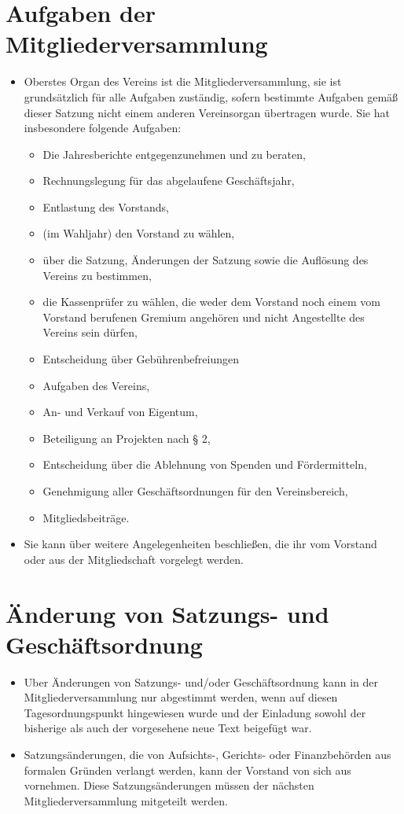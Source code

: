 \documentclass[a4paper,10pt]{article}
\begin{document}
\section{Aufgaben der Mitgliederversammlung}
  \begin{itemize}
   \item Oberstes Organ des Vereins ist die Mitgliederversammlung, sie ist grundsätzlich für alle Aufgaben zuständig, sofern bestimmte Aufgaben gemäß dieser Satzung nicht einem anderen Vereinsorgan übertragen wurde. Sie hat insbesondere folgende Aufgaben: 
   \begin{itemize}
    \item Die Jahresberichte entgegenzunehmen und zu beraten, 
    \item Rechnungslegung für das abgelaufene Geschäftsjahr, 
    \item Entlastung des Vorstands, 
    \item (im Wahljahr) den Vorstand zu wählen, 
    \item über die Satzung, Änderungen der Satzung sowie die Auflösung des Vereins zu bestimmen, 
    \item die Kassenprüfer zu wählen, die weder dem Vorstand noch einem vom Vorstand berufenen Gremium angehören und nicht Angestellte des Vereins sein dürfen, 
    \item Entscheidung über Gebührenbefreiungen
    \item Aufgaben des Vereins, 
    \item An- und Verkauf von Eigentum, 
    \item Beteiligung an Projekten nach § 2, 
    \item Entscheidung über die Ablehnung von Spenden und Fördermitteln, 
    \item Genehmigung aller Geschäftsordnungen für den Vereinsbereich, 
    \item Mitgliedsbeiträge. 
   \end{itemize}
   \item Sie kann über weitere Angelegenheiten beschließen, die ihr vom Vorstand oder aus der Mitgliedschaft vorgelegt werden. 
  \end{itemize}
  
\section{Änderung von Satzungs- und Geschäftsordnung}
  \begin{itemize}
   \item Uber Änderungen von Satzungs- und/oder Geschäftsordnung kann in der Mitgliederversammlung nur abgestimmt werden, wenn auf diesen Tagesordnungspunkt hingewiesen wurde und der Einladung sowohl der bisherige als auch der vorgesehene neue Text beigefügt war.
   \item Satzungsänderungen, die von Aufsichts-, Gerichts- oder Finanzbehörden aus formalen Gründen verlangt werden, kann der Vorstand von sich aus vornehmen. Diese Satzungsänderungen müssen der nächsten Mitgliederversammlung mitgeteilt werden.
  \end{itemize}
\end{document}
